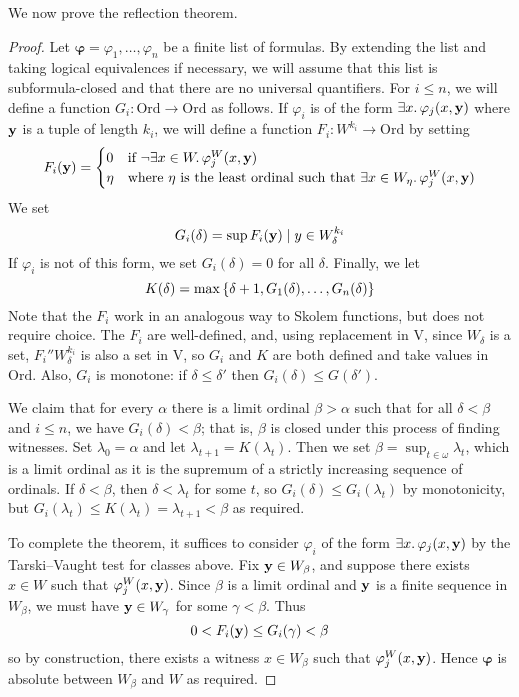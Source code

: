 We now prove the reflection theorem.
\begin{proof}
    Let \( \bm\varphi = \varphi_1, \dots, \varphi_n \) be a finite list of formulas.
    By extending the list and taking logical equivalences if necessary, we will assume that this list is subformula-closed and that there are no universal quantifiers.
    For \( i \leq n \), we will define a function \( G_i : \mathrm{Ord} \to \mathrm{Ord} \) as follows.
    If \( \varphi_i \) is of the form \( \exists x.\, \varphi_j(x, \vb y) \) where \( \vb y \) is a tuple of length \( k_i \), we will define a function \( F_i : W^{k_i} \to \mathrm{Ord} \) by setting
    \[ F_i(\vb y) = \begin{cases}
        0 & \text{if } \neg\exists x \in W.\, \varphi_j^W(x, \vb y) \\
        \eta & \text{where } \eta \text{ is the least ordinal such that } \exists x \in W_\eta.\, \varphi_j^W(x, \vb y)
    \end{cases} \]
    We set
    \[ G_i(\delta) = \sup{F_i(\vb y) \mid y \in W_\delta^{k_i}} \]
    If \( \varphi_i \) is not of this form, we set \( G_i(\delta) = 0 \) for all \( \delta \).
    Finally, we let
    \[ K(\delta) = \max\qty{\delta + 1, G_1(\delta), \dots, G_n(\delta)} \]
    Note that the \( F_i \) work in an analogous way to Skolem functions, but does not require choice.
    The \( F_i \) are well-defined, and, using replacement in \( \mathrm{V} \), since \( W_\delta \) is a set, \( F_i '' W_\delta^{k_i} \) is also a set in \( \mathrm{V} \), so \( G_i \) and \( K \) are both defined and take values in \( \mathrm{Ord} \).
    Also, \( G_i \) is monotone: if \( \delta \leq \delta' \) then \( G_i(\delta) \leq G(\delta') \).

    We claim that for every \( \alpha \) there is a limit ordinal \( \beta > \alpha \) such that for all \( \delta < \beta \) and \( i \leq n \), we have \( G_i(\delta) < \beta \); that is, \( \beta \) is closed under this process of finding witnesses.
    Set \( \lambda_0 = \alpha \) and let \( \lambda_{t+1} = K(\lambda_t) \).
    Then we set \( \beta = \sup_{t \in \omega} \lambda_t \), which is a limit ordinal as it is the supremum of a strictly increasing sequence of ordinals.
    If \( \delta < \beta \), then \( \delta < \lambda_t \) for some \( t \), so \( G_i(\delta) \leq G_i(\lambda_t) \) by monotonicity, but \( G_i(\lambda_t) \leq K(\lambda_t) = \lambda_{t+1} < \beta \) as required.

    To complete the theorem, it suffices to consider \( \varphi_i \) of the form \( \exists x.\, \varphi_j(x, \vb y) \) by the Tarski--Vaught test for classes above.
    Fix \( \vb y \in W_\beta \), and suppose there exists \( x \in W \) such that \( \varphi_j^W(x, \vb y) \).
    Since \( \beta \) is a limit ordinal and \( \vb y \) is a finite sequence in \( W_\beta \), we must have \( \vb y \in W_\gamma \) for some \( \gamma < \beta \).
    Thus
    \[ 0 < F_i(\vb y) \leq G_i(\gamma) < \beta \]
    so by construction, there exists a witness \( x \in W_\beta \) such that \( \varphi_j^W(x, \vb y) \).
    Hence \( \bm\varphi \) is absolute between \( W_\beta \) and \( W \) as required.
\end{proof}

